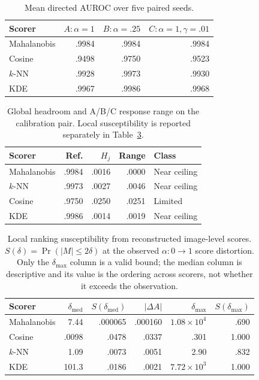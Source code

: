 \documentclass[11pt,a4paper]{article}
\begin{document}
\begin{table}[t]
\centering
\caption{Mean directed AUROC over five paired seeds.}
\label{tab:rq3}
\small
\begin{tabular}{lrrr}
\toprule
Scorer & $A:\alpha=1$ & $B:\alpha=.25$ & $C:\alpha=1,\gamma=.01$\\
\midrule
Mahalanobis & .9984 & .9984 & .9984\\
Cosine & .9498 & .9750 & .9523\\
$k$-NN & .9928 & .9973 & .9930\\
KDE & .9967 & .9986 & .9968\\
\bottomrule
\end{tabular}
\end{table}

\begin{table}[t]
\centering
\caption{Global headroom and A/B/C response range on the calibration pair. Local susceptibility is reported separately in Table~\ref{tab:susceptibility}.}
\label{tab:headroom}
\small
\begin{tabular}{lrrrl}
\toprule
Scorer & Ref. & $H_j$ & Range & Class\\
\midrule
Mahalanobis & .9984 & .0016 & .0000 & Near ceiling\\
$k$-NN & .9973 & .0027 & .0046 & Near ceiling\\
Cosine & .9750 & .0250 & .0251 & Limited\\
KDE & .9986 & .0014 & .0019 & Near ceiling\\
\bottomrule
\end{tabular}
\end{table}

\begin{table}[t]
\centering
\caption{Local ranking susceptibility from reconstructed image-level scores. $S(\delta)=\Pr(|M|\le2\delta)$ at the observed $\alpha\!:\!0\!\to\!1$ score distortion. Only the $\delta_{\max}$ column is a valid bound; the median column is descriptive and its value is the ordering across scorers, not whether it exceeds the observation.}
\label{tab:susceptibility}
\small
\begin{tabular}{lrrrrr}
\toprule
Scorer & $\delta_{\mathrm{med}}$ & $S(\delta_{\mathrm{med}})$ & $|\Delta A|$ & $\delta_{\max}$ & $S(\delta_{\max})$\\
\midrule
Mahalanobis & 7.44 & .000065 & .000160 & $1.08{\times}10^{4}$ & .690\\
Cosine & .0098 & .0478 & .0337 & .301 & 1.000\\
$k$-NN & 1.09 & .0073 & .0051 & 2.90 & .832\\
KDE & 101.3 & .0186 & .0021 & $7.72{\times}10^{3}$ & 1.000\\
\bottomrule
\end{tabular}
\end{table}
\end{document}
